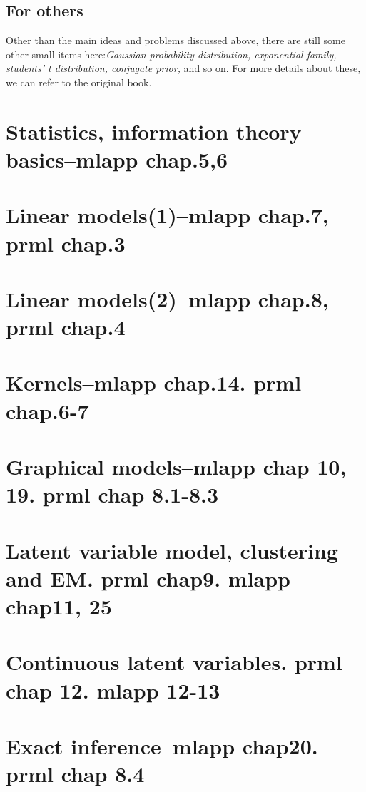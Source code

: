 \documentclass{article}
\begin{document}
\subsection*{For others}
Other than the main ideas and problems discussed above, there are still some other small items here:\emph{Gaussian probability distribution, exponential family, students' t distribution, conjugate prior, } and so on. For more details about these, we can refer to the original book. 

\section{Statistics, information theory basics--mlapp chap.5,6}

\section{Linear models(1)--mlapp chap.7, prml chap.3}

\section{Linear models(2)--mlapp chap.8, prml chap.4}

\section{Kernels--mlapp chap.14. prml chap.6-7}

\section{Graphical models--mlapp chap 10, 19. prml chap 8.1-8.3}

\section{Latent variable model, clustering and EM. prml chap9. mlapp chap11, 25}

\section{Continuous latent variables. prml chap 12. mlapp 12-13}

\section{Exact inference--mlapp chap20. prml chap 8.4}
\end{document}
